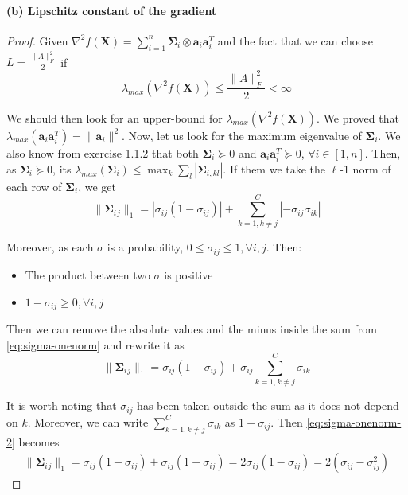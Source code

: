 \documentclass[12pt]{article}
\newcommand{\boldX}{\mathbf{X}}
\newcommand{\aat}{\mathbf{a}_{i} \mathbf{a}_{i}^{T}}
\newcommand{\bigsigma}{\mathbf{\Sigma}_{i}}
\begin{document}
\paragraph{(b) Lipschitz constant of the gradient}
\begin{proof}
Given $\nabla^2 f(\boldX) = \sum_{i=1}^{n} \bigsigma \otimes \aat$ and the fact that we can choose $L = \frac{\lVert A \rVert_{F}^{2}}{2}$ if
\begin{equation} \label{eq:L-condition}
    \lambda_{max}(\nabla^{2}f(\boldX)) \leq \frac{\lVert A \rVert_{F}^{2}}{2} < \infty
\end{equation}

We should then look for an upper-bound for $\lambda_{max}(\nabla^{2}f(\boldX))$. We proved that $\lambda_{max}(\aat) = \lVert \mathbf{a}_{i} \rVert ^{2}$. Now, let us look for the maximum eigenvalue of $\bigsigma$. We also know from exercise 1.1.2 that both $\bigsigma \succeq 0$ and $\aat \succeq 0$, $\forall i \in [1, n]$. Then, as $\bigsigma \succeq 0$, its $\lambda_{max}(\bigsigma) \leq \max_{k} \sum_{l} |\mathbf{\Sigma}_{i,kl}|$. If them we take the $\ell$-1 norm of each row of $\bigsigma$, we get
\begin{equation} \label{eq:sigma-onenorm}
\lVert \bigsigma{}_{j} \rVert_{1} = |\sigma_{ij}(1 - \sigma_{ij})| + \sum_{k=1,k \neq j}^{C} | -\sigma_{ij}\sigma_{ik}| 
\end{equation}

Moreover, as each $\sigma$ is a probability, $0 \leq \sigma_{ij} \leq 1, \forall i,j$. Then:
\begin{itemize}
    \item The product between two $\sigma$ is positive
    \item $1 - \sigma_{ij} \geq 0, \forall i,j$
\end{itemize}
Then we can remove the absolute values and the minus inside the sum from \eqref{eq:sigma-onenorm} and rewrite it as
\begin{equation} \label{eq:sigma-onenorm-2}
    \lVert \bigsigma{}_{j} \rVert_{1} = \sigma_{ij}(1 - \sigma_{ij}) + \sigma_{ij} \sum_{k=1,k \neq j}^{C} \sigma_{ik}
\end{equation}

It is worth noting that $\sigma_{ij}$ has been taken outside the sum as it does not depend on $k$. Moreover, we can write $\sum_{k=1,k \neq j}^{C} \sigma_{ik}$ as $1 - \sigma_{ij}$. Then \eqref{eq:sigma-onenorm-2} becomes
\begin{gather} \label{eq:sigma-onenorm-3}
    \lVert \bigsigma{}_{j} \rVert_{1} = \sigma_{ij}(1 - \sigma_{ij}) + \sigma_{ij}(1 - \sigma_{ij}) = 2 \sigma_{ij}(1 - \sigma_{ij}) = 2(\sigma_{ij} - \sigma_{ij}^{2})
\end{gather}


\end{proof}
\end{document}
